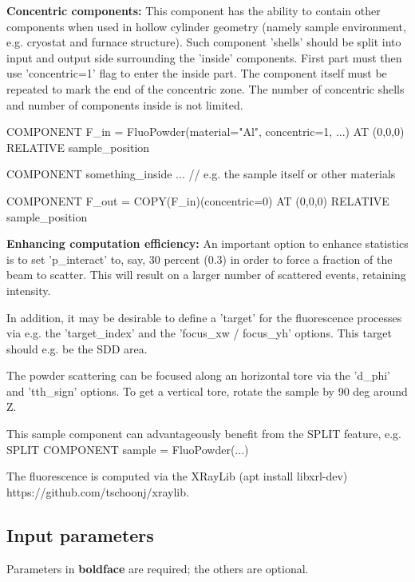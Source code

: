\textbf{Concentric components:} This component has the ability to contain other components when used in hollow cylinder geometry (namely sample environment, e.g. cryostat and furnace structure). Such component 'shells' should be split into input and output side surrounding the 'inside' components. First part must then use 'concentric=1' flag to enter the inside part. The component itself must be repeated to mark the end of the concentric zone. The number of concentric shells and number of components inside is not limited.

COMPONENT F\_in = FluoPowder(material="Al", concentric=1, ...) AT (0,0,0) RELATIVE sample\_position

COMPONENT something\_inside ... // e.g. the sample itself or other materials

COMPONENT F\_out = COPY(F\_in)(concentric=0) AT (0,0,0) RELATIVE sample\_position

\textbf{Enhancing computation efficiency:} An important option to enhance statistics is to set 'p\_interact' to, say, 30 percent (0.3) in order to force a fraction of the beam to scatter. This will result on a larger number of scattered events, retaining intensity.

In addition, it may be desirable to define a 'target' for the fluorescence processes via e.g. the 'target\_index' and the 'focus\_xw / focus\_yh' options. This target should e.g. be the SDD area.

The powder scattering can be focused along an horizontal tore via the 'd\_phi' and 'tth\_sign' options. To get a vertical tore, rotate the sample by 90 deg around Z.

This sample component can advantageously benefit from the SPLIT feature, e.g. SPLIT COMPONENT sample = FluoPowder(...)

The fluorescence is computed via the XRayLib (apt install libxrl-dev) https://github.com/tschoonj/xraylib.

\subsection*{Input parameters}
Parameters in \textbf{boldface} are required; the others are optional.

